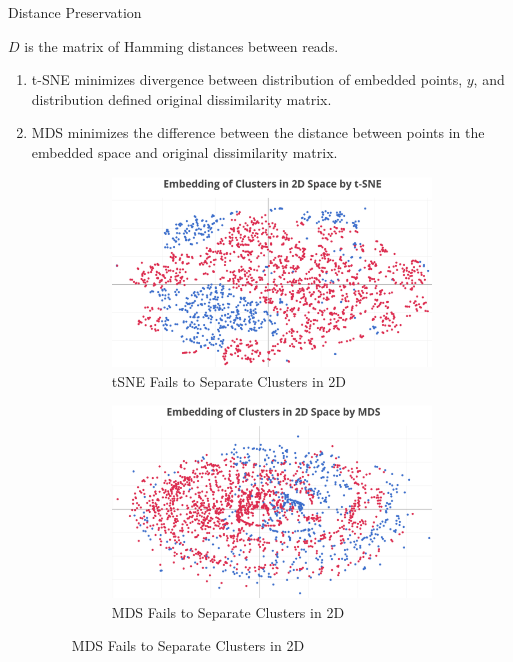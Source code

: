 \documentclass[final]{beamer}
\newlength{\onecolwid}
\begin{document}
\begin{frame}[t]
\begin{columns}[t]
\begin{column}{\onecolwid}
\begin{block}{Distance Preservation}

$D$ is the matrix of Hamming distances between reads.

\begin{enumerate}
\item t-SNE \cite{maaten2008visualizing} minimizes divergence between distribution of embedded points, $y$, and distribution defined original dissimilarity matrix. 

\item MDS \cite{kruskal1964nonmetric} minimizes the difference between the distance between points in the embedded space and original dissimilarity matrix. 
\begin{figure}[!ht]
\begin{subfigure}{.5\textwidth}
    \centering
    \includegraphics[width=.9\linewidth]{images/tSNE_noNN.png}
    \caption{tSNE Fails to Separate Clusters in 2D}
\end{subfigure}%
\begin{subfigure}{.5\textwidth}
    \centering
    \includegraphics[width=.9\linewidth]{images/MDS_noNN.png}
    \caption{MDS Fails to Separate Clusters in 2D}
\end{subfigure}
\end{figure}


\end{enumerate}
\end{block}
\end{column}
\end{columns}
\end{frame}
\end{document}
